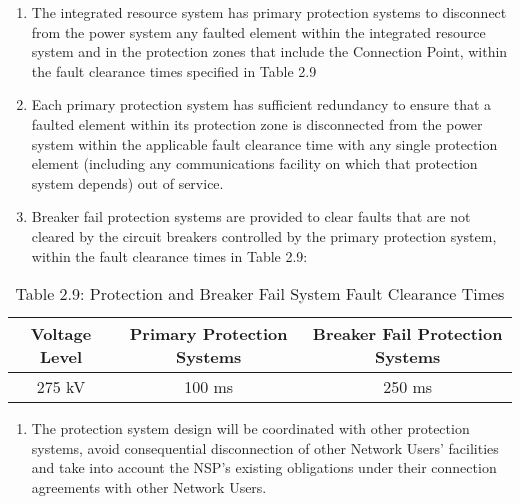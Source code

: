 \begin{enumerate}[label=(\alph*)]
	\item The integrated resource system has primary protection systems to disconnect from the power system any faulted element within the integrated resource system and in the protection zones that include the Connection Point, within the fault clearance times specified in Table 2.9  
	\item Each primary protection system has sufficient redundancy to ensure that a faulted element within its protection zone is disconnected from the power system within the applicable fault clearance time with any single protection element (including any communications facility on which that protection system depends) out of service.
	\item Breaker fail protection systems are provided to clear faults that are not cleared by the circuit breakers controlled by the primary protection system, within the fault clearance times in Table 2.9:   
\end{enumerate}

\begin{table}[H]
	\centering
	\begin{tabular}{|c|c|c|}
		\hline
		\textbf{Voltage Level} & \textbf{Primary Protection Systems} & \textbf{Breaker Fail Protection Systems} \\ \hline
		275 kV & 100 ms & 250 ms \\ \hline
	\end{tabular}
	\caption*{Table 2.9: Protection and Breaker Fail System Fault Clearance Times}
\end{table}

\begin{enumerate}[label=(\alph*),start=4]
	\item The protection system design will be coordinated with other protection systems, avoid consequential disconnection of other Network Users’ facilities and take into account the NSP’s existing obligations under their connection agreements with other Network Users.
\end{enumerate}
